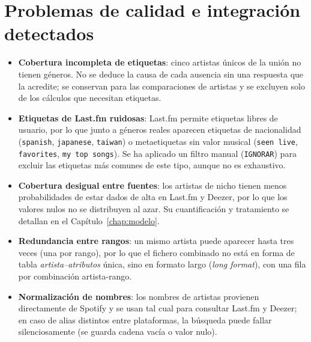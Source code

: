 \section{Problemas de calidad e integración detectados}
\label{sec:calidad}

\begin{itemize}
    \item \textbf{Cobertura incompleta de etiquetas}: cinco artistas únicos de la unión no tienen géneros. No se deduce la causa de cada ausencia sin una respuesta que la acredite; se conservan para las comparaciones de artistas y se excluyen solo de los cálculos que necesitan etiquetas.
    \item \textbf{Etiquetas de Last.fm ruidosas}: Last.fm permite etiquetas libres de usuario, por lo que junto a géneros reales aparecen etiquetas de nacionalidad (\texttt{spanish}, \texttt{japanese}, \texttt{taiwan}) o metaetiquetas sin valor musical (\texttt{seen live}, \texttt{favorites}, \texttt{my top songs}). Se ha aplicado un filtro manual (\texttt{IGNORAR}) para excluir las etiquetas más comunes de este tipo, aunque no es exhaustivo.
    \item \textbf{Cobertura desigual entre fuentes}: los artistas de nicho tienen menos probabilidades de estar dados de alta en Last.fm y Deezer, por lo que los valores nulos no se distribuyen al azar. Su cuantificación y tratamiento se detallan en el Capítulo~\ref{chap:modelo}.
    \item \textbf{Redundancia entre rangos}: un mismo artista puede aparecer hasta tres veces (una por rango), por lo que el fichero combinado no está en forma de tabla \emph{artista--atributos} única, sino en formato largo (\emph{long format}), con una fila por combinación artista-rango.
    \item \textbf{Normalización de nombres}: los nombres de artistas provienen directamente de Spotify y se usan tal cual para consultar Last.fm y Deezer; en caso de alias distintos entre plataformas, la búsqueda puede fallar silenciosamente (se guarda cadena vacía o valor nulo).
\end{itemize}
